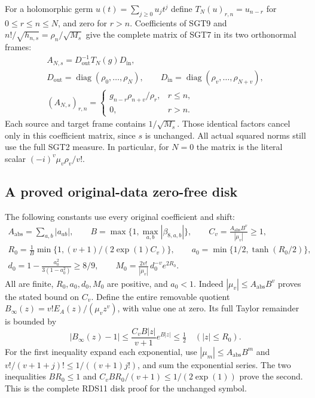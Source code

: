 \documentclass[11pt,a4paper]{article}
\begin{document}
For a holomorphic germ $u(t)=\sum_{j\ge0}u_jt^j$ define
$T_N(u)_{r,n}=u_{n-r}$ for $0\le r\le n\le N$, and zero for $r>n$.
Coefficients of SGT9 and $n!/\sqrt{h_{n,s}}=\rho_n/\sqrt{M_s}$
give the complete matrix of SGT7 in its two orthonormal frames:
\[
\begin{gathered}
 A_{N,s}=D_{\mathrm{out}}^{-1}T_N(g)D_{\mathrm{in}},\\
 D_{\mathrm{out}}=\operatorname{diag}(\rho_0,\ldots,\rho_N),
 \qquad
 D_{\mathrm{in}}=\operatorname{diag}(\rho_v,\ldots,\rho_{N+v}),\\
 (A_{N,s})_{r,n}=
 \begin{cases}
 g_{n-r}\rho_{n+v}/\rho_r,&r\le n,\\0,&r>n .
 \end{cases}
\end{gathered}\tag{SGT10}
\]
Each source and target frame contains $1/\sqrt{M_s}$. Those identical
factors cancel only in this coefficient matrix, since $s$ is unchanged.
All actual squared norms still use the full SGT2 measure.
In particular, for $N=0$ the matrix is the literal scalar
$(-i)^v\mu_v\rho_v/v!$.

\subsection{A proved original-data zero-free disk}

The following constants use every original coefficient and shift:
\[
\begin{gathered}
 A_{\mathrm{abs}}=\sum_{a,b}|a_{ab}|,\qquad
 B=\max\{1,\max_{a,b}|\beta_{8,a,b}|\},\qquad
 C_v=\frac{A_{\mathrm{abs}}B^v}{|\mu_v|}\ge1,\\
 R_0=\frac1B\min\{1,(v+1)/(2\exp(1)C_v)\},\qquad
 a_0=\min\{1/2,\tanh(R_0/2)\},\\
 d_0=1-\frac{a_0^2}{3(1-a_0^2)}\ge8/9,\qquad
 M_0=\frac{2v!}{|\mu_v|}\,d_0^{-v}e^{2R_0}.
\end{gathered}\tag{SGT11}
\]
All are finite, $R_0,a_0,d_0,M_0$ are positive, and $a_0<1$.
Indeed $|\mu_v|\le A_{\mathrm{abs}}B^v$ proves the stated bound
on $C_v$. Define the entire removable quotient
$B_\infty(z)=v!E_A(z)/(\mu_vz^v)$, with value one at zero.
Its full Taylor remainder is bounded by
\[
 |B_\infty(z)-1|
 \le\frac{C_vB|z|}{v+1}e^{B|z|}
 \le\tfrac12\quad(|z|\le R_0).
 \tag{SGT12}
\]
For the first inequality expand each exponential, use
$|\mu_m|\le A_{\mathrm{abs}}B^m$ and
$v!/(v+1+j)!\le1/((v+1)j!)$, and sum the exponential series.
The two inequalities $BR_0\le1$ and
$C_vBR_0/(v+1)\le1/(2\exp(1))$ prove the second.
This is the complete RDS11 disk proof for the unchanged symbol.
\end{document}
